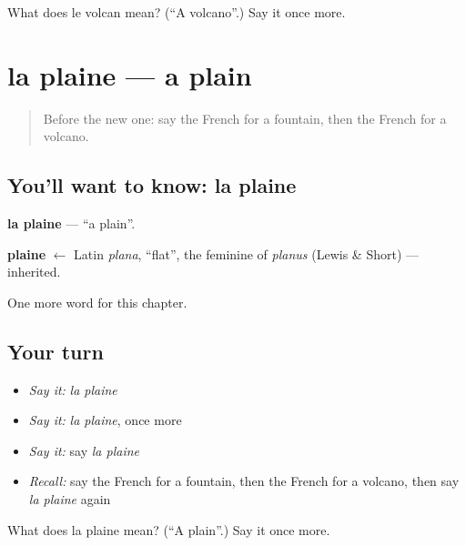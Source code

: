 \begin{tcolorbox}[breakable,colback=teal!4,colframe=teal!35!black,title={Before you move on}]
What does le volcan mean? (\textquotedblleft{}A volcano\textquotedblright{}.) Say it once more.
\end{tcolorbox}
\section[la plaine]{la plaine — a plain}

\label{lesson:FR-C171-plaine}



\begin{quote}
Before the new one: say the French for a fountain, then the French for a volcano.
\end{quote}

\subsection*{You'll want to know: la plaine}
\textbf{la plaine} — \textquotedblleft{}a plain\textquotedblright{}.

\begin{cousinweb}
\textbf{plaine} $\leftarrow$ Latin \emph{plana}, \textquotedblleft{}flat\textquotedblright{}, the feminine of \emph{planus} (Lewis \& Short) — inherited.
\end{cousinweb}

\begin{grammarlens}[title={What you've built}]
One more word for this chapter.
\end{grammarlens}

\subsection*{Your turn}
\begin{itemize}
\raggedright
  \item \emph{Say it:} \emph{la plaine}
  \item \emph{Say it:} \emph{la plaine}, once more
  \item \emph{Say it:} say \emph{la plaine}
  \item \emph{Recall:} say the French for a fountain, then the French for a volcano, then say \emph{la plaine} again
\end{itemize}

\begin{tcolorbox}[breakable,colback=teal!4,colframe=teal!35!black,title={Before you move on}]
What does la plaine mean? (\textquotedblleft{}A plain\textquotedblright{}.) Say it once more.
\end{tcolorbox}
